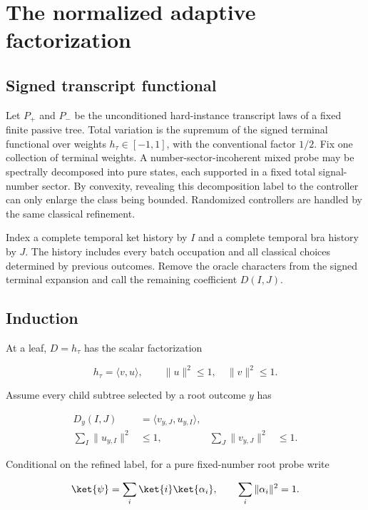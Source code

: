 \section{The normalized adaptive factorization}
\label{app:adaptive}

\subsection{Signed transcript functional}

Let $P_+$ and $P_-$ be the unconditioned hard-instance transcript laws of a fixed finite passive tree. Total variation is the supremum of the signed terminal functional over weights $h_\tau\in[-1,1]$, with the conventional factor $1/2$. Fix one collection of terminal weights. A number-sector-incoherent mixed probe may be spectrally decomposed into pure states, each supported in a fixed total signal-number sector. By convexity, revealing this decomposition label to the controller can only enlarge the class being bounded. Randomized controllers are handled by the same classical refinement.

Index a complete temporal ket history by $I$ and a complete temporal bra history by $J$. The history includes every batch occupation and all classical choices determined by previous outcomes. Remove the oracle characters from the signed terminal expansion and call the remaining coefficient $D(I,J)$.

\subsection{Induction}

At a leaf, $D=h_\tau$ has the scalar factorization

\begin{equation}
h_\tau=\langle v,u\rangle,
\qquad
\|u\|^2\le1,
\quad
\|v\|^2\le1.
\end{equation}

Assume every child subtree selected by a root outcome $y$ has

\begin{align}
D_y(I,J)&=\langle v_{y,J},u_{y,I}\rangle,
\\
\sum_I\|u_{y,I}\|^2&\le1,
&
\sum_J\|v_{y,J}\|^2&\le1.
\label{eq:app-child}
\end{align}

Conditional on the refined label, for a pure fixed-number root probe write

\begin{equation}
\ket{\psi}=\sum_i\ket{i}\ket{\alpha_i},
\qquad
\sum_i\|\alpha_i\|^2=1.
\end{equation}

